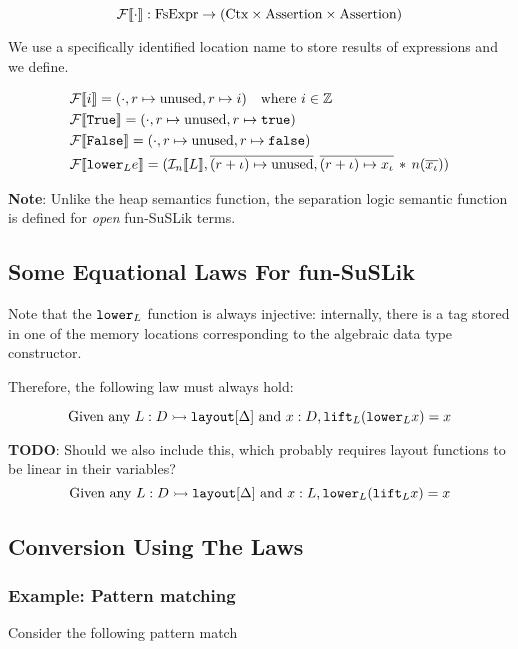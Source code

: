 \documentclass[10pt]{article}
\begin{document}
\begin{equation*}
  \mathcal{F}\llbracket\cdot\rrbracket : \textnormal{FsExpr} \rightarrow (\textnormal{Ctx} \times \textnormal{Assertion} \times \textnormal{Assertion})
\end{equation*}

\noindent
We use a specifically identified location name  to store results of expressions and we define.

\begin{align*}
  &\mathcal{F}\llbracket i\rrbracket = (\cdot, r \mapsto \textnormal{unused}, r \mapsto i)~~~\textnormal{where $i \in \mathbb{Z}$}\\
  &\mathcal{F}\llbracket\texttt{True}\rrbracket = (\cdot, r \mapsto \textnormal{unused}, r \mapsto \texttt{true})\\
  &\mathcal{F}\llbracket\texttt{False}\rrbracket = (\cdot, r \mapsto \textnormal{unused}, r \mapsto \texttt{false})\\
  &\mathcal{F}\llbracket\textnormal{\texttt{lower}}_{L} e\rrbracket = (\mathcal{I}_{n}\llbracket L\rrbracket, \overline{(r+\iota) \mapsto \textnormal{unused}}, \overline{(r+\iota) \mapsto x_{\iota}} \,*\, n(\overline{x_\iota}))\\
\end{align*}

\noindent
\textbf{Note}: Unlike the heap semantics function, the separation logic semantic function is defined for \textit{open} fun-SuSLik terms.


\subsection{Some Equational Laws For fun-SuSLik}

Note that the $\textnormal{\texttt{lower}}_{L}$ function is always injective: internally, there is a tag stored in one of the memory locations corresponding
to the algebraic data type constructor.

\noindent
Therefore, the following law must always hold:

\[
  \textnormal{Given any } L : D \rightarrowtail \texttt{layout}[\Delta] \textnormal{ and } x : D, \textnormal{\texttt{lift}}_{L} (\textnormal{\texttt{lower}}_{L} x) = x
\]

\noindent
\textbf{TODO}: Should we also include this, which probably requires layout functions to be linear in their variables?
\[
  \textnormal{Given any } L : D \rightarrowtail \texttt{layout}[\Delta] \textnormal{ and } x : L, \textnormal{\texttt{lower}}_{L} (\textnormal{\texttt{lift}}_{L} x) = x
\]

\subsection{Conversion Using The Laws}

\subsubsection{Example: Pattern matching}
Consider the following pattern match
\end{document}

